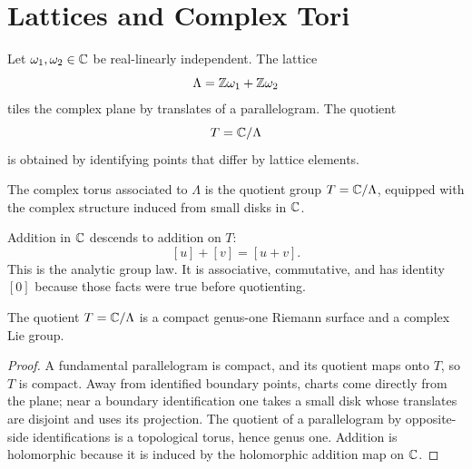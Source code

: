 \chapter{Lattices and Complex Tori}
\label{ch:lattices-tori}

Let \(\omega_1,\omega_2\in\mathbb{C}\) be real-linearly independent.  The lattice
\[
  \Lambda=\mathbb{Z}\omega_1+\mathbb{Z}\omega_2
\]
tiles the complex plane by translates of a parallelogram.  The quotient
\[
  T=\mathbb{C}/\Lambda
\]
is obtained by identifying points that differ by lattice elements.

\begin{definition}
The complex torus associated to \(\Lambda\) is the quotient group
\(T=\mathbb{C}/\Lambda\), equipped with the complex structure induced from small disks in
\(\mathbb{C}\).
\end{definition}

Addition in \(\mathbb{C}\) descends to addition on \(T\):
\[
  [u]+[v]=[u+v].
\]
This is the analytic group law.  It is associative, commutative, and has identity
\([0]\) because those facts were true before quotienting.

\begin{proposition}
\label{prop:torus-surface}
The quotient \(T=\mathbb{C}/\Lambda\) is a compact genus-one Riemann surface and a
complex Lie group.
\end{proposition}

\begin{proof}
A fundamental parallelogram is compact, and its quotient maps onto \(T\), so
\(T\) is compact.  Away from identified boundary points, charts come directly
from the plane; near a boundary identification one takes a small disk whose
translates are disjoint and uses its projection.  The quotient of a parallelogram
by opposite-side identifications is a topological torus, hence genus one.
Addition is holomorphic because it is induced by the holomorphic addition map on
\(\mathbb{C}\).
\end{proof}

\begin{center}
\end{center}

